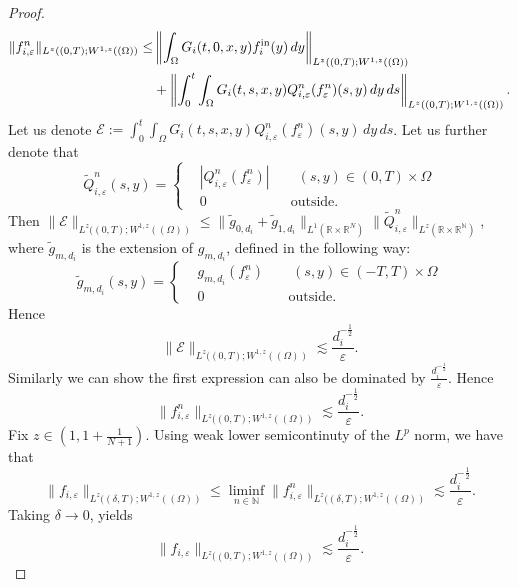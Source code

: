 \documentclass[a4paper,12pt,reqno]{amsart}
\theoremstyle{plain}
\numberwithin{equation}{section}
\begin{document}
\begin{proof}
		\begin{align*}
			\| f_{i,\varepsilon}^n\|_{L^{z}((0,T); W^{1,z}((\Omega))} \leq &\left \| \int_{\Omega}G_i(t,0,x,y)f_i^{\rm{in}}(y) \, dy \right\|_{L^{z}((0,T); W^{1,z}((\Omega))}\\
			&+ \left \| \int_0^t \int_{\Omega}  G_i(t,s,x,y) Q_{i,\varepsilon}^n(f_{\varepsilon}^n)(s,y) \, dy\, ds \right\|_{L^{z}((0,T); W^{1,z}((\Omega))}. 
		\end{align*}
		Let us denote $\displaystyle{\mathcal{E}:= \int_0^t \int_{\Omega}  G_i(t,s,x,y) Q_{i,\varepsilon}^n(f_{\varepsilon}^n)(s,y) \, dy\, ds }$. Let us further denote that
		\begin{equation*}
			\tilde{Q}_{i,\varepsilon}^n (s,y) =
			\left\{
			\begin{aligned}
				&|Q_{i,\varepsilon}^n (f_{\varepsilon}^n)| \qquad (s,y)\in (0,T)\times\Omega\\
				&0 \qquad \qquad \qquad \mbox{outside}.
			\end{aligned}
			\right .
		\end{equation*}
		Then $\displaystyle{\|\mathcal{E}\|_{L^{z}((0,T); W^{1,z}((\Omega))}\leq \| \tilde{g}_{0,d_i}+\tilde{g}_{1,d_i}\|_{L^{1}(\mathbb{R}\times\mathbb{R}^N)}\| \tilde{Q}_{i,\varepsilon}^n\|_{L^{z}(\mathbb{R}\times\mathbb{R^N})}}$, where $\tilde{g}_{m,d_i}$ is the extension of $g_{m,d_i}$, defined in the following way:
		\begin{equation*}
			\tilde{g}_{m,d_i} (s,y) =
			\left\{
			\begin{aligned}
				&g_{m,d_i} (f_{\varepsilon}^n) \qquad (s,y)\in (-T,T)\times\Omega\\
				&0 \qquad \qquad \qquad \mbox{outside}.
			\end{aligned}
			\right .
		\end{equation*}
		Hence
		\[
		\|\mathcal{E}\|_{L^{z}((0,T); W^{1,z}((\Omega))}\lesssim \frac{d_i^{-\frac12}}{\varepsilon}. 
		\]
		Similarly we can show the first expression can also be dominated by $\displaystyle{\frac{d_i^{-\frac12}}{\varepsilon}}$. Hence
		\[
		\| f_{i,\varepsilon}^n\|_{L^{z}((0,T); W^{1,z}((\Omega))} \lesssim \frac{d_i^{-\frac12}}{\varepsilon}. 
		\]
		Fix $z\in\left(1,1+\frac{1}{N+1}\right)$. Using weak lower semicontinuty of the $L^p$ norm, we have that
		\[
		\| f_{i,\varepsilon}\|_{L^{z}((\delta,T); W^{1,z}((\Omega))} \leq \liminf\limits_{n\in\mathbb{N}}\| f_{i,\varepsilon}^n\|_{L^{z}((\delta,T); W^{1,z}((\Omega))}\lesssim \frac{d_i^{-\frac12}}{\varepsilon}.
		\]
		Taking $\delta\to 0$, yields
		\[
		\| f_{i,\varepsilon}\|_{L^{z}((0,T); W^{1,z}((\Omega))} \lesssim \frac{d_i^{-\frac12}}{\varepsilon}.
\]
\end{proof}
\end{document}

